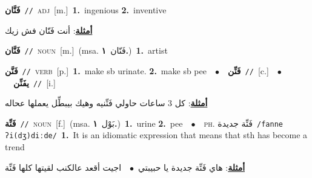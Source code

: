 \documentclass[10pt,a4paper,twoside]{article} %
\begin{document}
\begin{multicols}{2}
{\setlength\topsep{0pt}\textbf{\foreignlanguage{arabic}{فَنَّان}}\ {\color{gray}\texttt{//}\color{black}}\ \textsc{adj}\ [m.]\ \textbf{1.}~ingenious  \textbf{2.}~inventive\  \begin{flushright}\color{gray}\foreignlanguage{arabic}{\textbf{\underline{\foreignlanguage{arabic}{أمثلة}}}: أنت فَنّان فش زيك}\end{flushright}\color{black}} \vspace{2mm}

{\setlength\topsep{0pt}\textbf{\foreignlanguage{arabic}{فَنَّان}}\ {\color{gray}\texttt{//}\color{black}}\ \textsc{noun}\ [m.]\ \color{gray}(msa. \foreignlanguage{arabic}{فَنّان}~\foreignlanguage{arabic}{\textbf{١.}})\color{black}\ \textbf{1.}~artist\ } \vspace{2mm}

{\setlength\topsep{0pt}\textbf{\foreignlanguage{arabic}{فَنَّن}}\ {\color{gray}\texttt{//}\color{black}}\ \textsc{verb}\ [p.]\ \textbf{1.}~make sb urinate.  \textbf{2.}~make sb pee\ \ $\bullet$\ \ \setlength\topsep{0pt}\textbf{\foreignlanguage{arabic}{فَنِّن}}\ {\color{gray}\texttt{//}\color{black}}\ [c.]\ \ $\bullet$\ \ \setlength\topsep{0pt}\textbf{\foreignlanguage{arabic}{يفَنِّن}}\ {\color{gray}\texttt{//}\color{black}}\ [i.]\  \begin{flushright}\color{gray}\foreignlanguage{arabic}{\textbf{\underline{\foreignlanguage{arabic}{أمثلة}}}: كل 3 ساعات حاولي فَنِّنيه وهيك بيبطِّل يعملها عحاله}\end{flushright}\color{black}} \vspace{2mm}

{\setlength\topsep{0pt}\textbf{\foreignlanguage{arabic}{فَنِّة}}\ {\color{gray}\texttt{//}\color{black}}\ \textsc{noun}\ [f.]\ \color{gray}(msa. \foreignlanguage{arabic}{بَوْل}~\foreignlanguage{arabic}{\textbf{١.}})\color{black}\ \textbf{1.}~urine  \textbf{2.}~pee\ \ $\bullet$\ \ \textsc{ph.} \color{gray} \foreignlanguage{arabic}{فَنِّة جديدة}\color{black}\ {\color{gray}\texttt{/{\sffamily fanne ʔi(dʒ)diːde}/}\color{black}}\ \textbf{1.}~It is an idiomatic expression that means that sth has become a trend\  \begin{flushright}\color{gray}\foreignlanguage{arabic}{\textbf{\underline{\foreignlanguage{arabic}{أمثلة}}}: هاي فَنِّة جديدة يا حبيبتي\ $\bullet$\ \  اجيت أقعد عالكنب لقيتها كلها فَنِّة}\end{flushright}\color{black}} \vspace{2mm}


\end{multicols}
\end{document}
